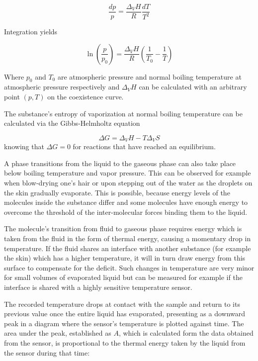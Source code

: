 {\begin{equation} \label{eq:6.6} %
    \frac{dp}{p} = \frac{\Delta_VH}{R} \frac{dT}{T^2}
\end{equation}

Integration yields

\begin{equation} \label{eq:6.7} %
    \ln \left( \frac{p}{p_0} \right) = \frac{\Delta_VH}{R} \left( \frac{1}{T_0} - \frac{1}{T} \right)
\end{equation}

Where $p_0$ and $T_0$ are atmospheric pressure and normal boiling temperature at atmospheric pressure respectively and $\Delta_VH$ can be calculated with an arbitrary point $(p, T)$ on the coexistence curve.


The substance’s entropy of vaporization at normal boiling temperature can be calculated via the Gibbs-Helmholtz equation 

\begin{equation}\label{eq:gibbs} %
    \Delta G = \Delta_VH - T \Delta_VS
\end{equation}
knowing that $\Delta G = 0$ for reactions that have reached an equilibrium.

A phase transitions from the liquid to the gaseous phase can also take place below boiling temperature and vapor pressure. This can be observed for example when blow-drying one’s hair or upon stepping out of the water as the droplets on the skin gradually evaporate. This is possible, because energy levels of the molecules inside the substance differ and some molecules have enough energy to overcome the threshold of the inter-molecular forces binding them to the liquid.

The molecule’s transition from fluid to gaseous phase requires energy which is taken from the fluid in the form of thermal energy, causing a momentary drop in temperature. If the fluid shares an interface with another substance (for example the skin) which has a higher temperature, it will in turn draw energy from this surface to compensate for the deficit.
Such changes in temperature are very minor for small volumes of evaporated liquid but can be measured for example if the interface is shared with a highly sensitive temperature sensor. 

The recorded temperature drops at contact with the sample and return to its previous value once the entire liquid has evaporated, presenting as a downward peak in a diagram where the sensor’s temperature is plotted against time. The area under the peak, established as $A$, which is calculated form the data obtained from the sensor, is proportional to the thermal energy taken by the liquid from the sensor during that time:

}
